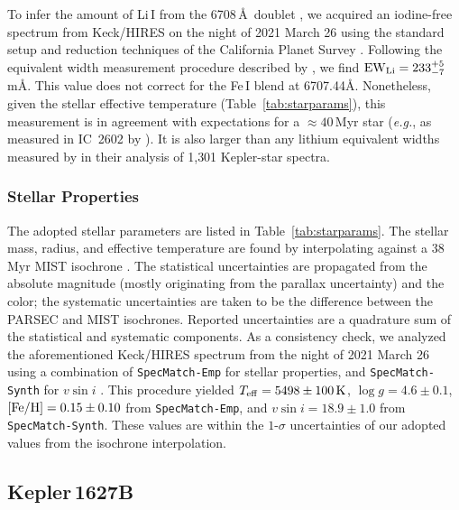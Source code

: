 \documentclass[12pt,modern,twocolumn,tighten]{aastex63}
\begin{document}
To infer the amount of Li\,\textsc{I} from the 6708\,\AA\ doublet
\citep[{\it e.g.},][]{soderblom_ages_2014}, we acquired an iodine-free
spectrum from Keck/HIRES on the night of 2021 March 26 using the
standard setup and reduction techniques of the California Planet
Survey \citep{howard_cps_2010}.  Following the equivalent width
measurement procedure described by \citet{bouma_2021_ngc2516}, we find
${\rm EW}_{\rm Li} = 233^{+5}_{-7}$\,m\AA.   This value does not
correct for the Fe\,\textsc{I} blend at 6707.44\AA.  Nonetheless,
given the stellar effective temperature (Table~\ref{tab:starparams}),
this measurement is in agreement with expectations for a
$\approx40$\,Myr star ({\it e.g.}, as measured in IC~2602 by
\citealt{randich_gaiaeso_2018}).  It is also larger than any lithium
equivalent widths measured by \citet{berger_identifying_2018} in their
analysis of 1{,}301 Kepler-star spectra.


\subsubsection{Stellar Properties}

The adopted stellar parameters are listed in
Table~\ref{tab:starparams}.  The stellar mass, radius, and effective
temperature are found by interpolating against a 38$\,$Myr MIST
isochrone \citep{choi_mesa_2016}.  The statistical uncertainties are
propagated from the absolute magnitude (mostly originating from the
parallax uncertainty) and the color; the systematic uncertainties are
taken to be the difference between the PARSEC
\citep{bressan_parsec_2012} and MIST isochrones.  Reported
uncertainties are a quadrature sum of the statistical and systematic
components.  As a consistency check, we analyzed the aforementioned
Keck/HIRES spectrum from the night of 2021 March 26 using a
combination of \texttt{SpecMatch-Emp} for stellar properties, and
\texttt{SpecMatch-Synth} for $v\sin i$ \citep{yee_SM_2017}.  This
procedure yielded $T_{\rm eff}=5498\pm100\,{\rm K}$, $\log
g=4.6\pm0.1$, $[{\rm Fe/H}]=0.15\pm0.10$ from \texttt{SpecMatch-Emp},
and $v\sin i = 18.9\pm1.0$ from \texttt{SpecMatch-Synth}.  These
values are within the $1$-$\sigma$ uncertainties of our adopted values
from the isochrone interpolation.


\subsection{Kepler\,1627B}
\end{document}
